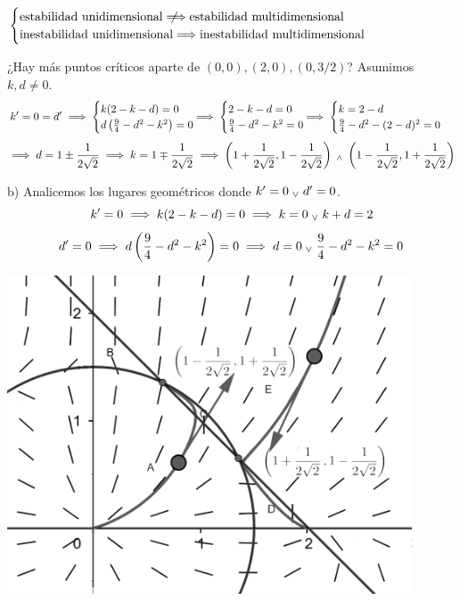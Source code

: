  $\begin{cases}
		\tex{estabilidad unidimensional$\nimplies$estabilidad multidimensional} \\
		\tex{inestabilidad unidimensional$\implies$inestabilidad multidimensional}
	\end{cases}$

¿Hay más puntos críticos aparte de $(0,0), (2,0), (0,3/2)$? Asumimos $k,d \neq 0$.
\[k'=0=d'\implies \begin{cases}
		k(2-k-d) = 0 \\
		d\left(\frac{9}{4} - d^2 - k^2\right) = 0
	\end{cases}\hspace{-0.5cm}\implies \begin{cases}
		2-k-d = 0 \\
		\frac{9}{4} - d^2 - k^2 = 0
	\end{cases}\hspace{-0.5cm}\implies \begin{cases}
		k = 2-d \\
		\frac{9}{4} - d^2 - (2-d)^2 = 0
	\end{cases}\]
\[\implies d = 1 \pm \frac{1}{2\sqrt{2}} \implies k = 1 \mp \frac{1}{2\sqrt{2}}\implies \left(1 + \frac{1}{2\sqrt{2}}, 1 - \frac{1}{2\sqrt{2}}\right) \; _{\wedge} \; \left(1 - \frac{1}{2\sqrt{2}}, 1 + \frac{1}{2\sqrt{2}}\right)\]

b) Analicemos los lugares geométricos donde $k'=0 \; _{\vee} \; d'=0$.
\[k'=0 \implies k(2-k-d) = 0 \implies k = 0 \; _{\vee} \; k+d = 2\]
\[d'=0 \implies d\left(\frac{9}{4} - d^2 - k^2\right) = 0 \implies d = 0 \; _{\vee} \; \frac{9}{4} - d^2 - k^2 = 0\]
\begin{center}
	\includegraphics[width=12cm]{img/diam3-8_contodo.png}
\end{center}

